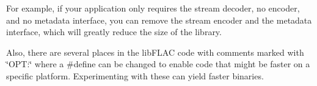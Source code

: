 For example, if your application only requires the stream decoder, no encoder, and no metadata interface, you can remove the stream encoder and the metadata interface, which will greatly reduce the size of the library.

Also, there are several places in the lib\+F\+L\+AC code with comments marked with \char`\"{}\+O\+P\+T\+:\char`\"{} where a \#define can be changed to enable code that might be faster on a specific platform. Experimenting with these can yield faster binaries. 